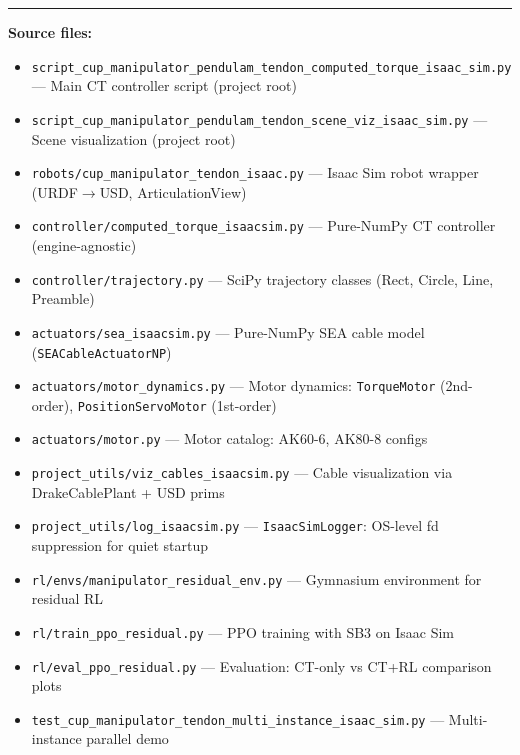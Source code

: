 \documentclass[11pt,a4paper]{article}
\begin{document}
\vfill
\noindent\rule{\linewidth}{0.4pt}
\begin{small}
\textbf{Source files:}
\begin{itemize}[leftmargin=2em, topsep=2pt, itemsep=1pt]
    \item \texttt{script\_cup\_manipulator\_pendulam\_tendon\_computed\_torque\_isaac\_sim.py} --- Main CT controller script (project root)
    \item \texttt{script\_cup\_manipulator\_pendulam\_tendon\_scene\_viz\_isaac\_sim.py} --- Scene visualization (project root)
    \item \texttt{robots/cup\_manipulator\_tendon\_isaac.py} --- Isaac Sim robot wrapper (URDF$\to$USD, ArticulationView)
    \item \texttt{controller/computed\_torque\_isaacsim.py} --- Pure-NumPy CT controller (engine-agnostic)
    \item \texttt{controller/trajectory.py} --- SciPy trajectory classes (Rect, Circle, Line, Preamble)
    \item \texttt{actuators/sea\_isaacsim.py} --- Pure-NumPy SEA cable model (\texttt{SEACableActuatorNP})
    \item \texttt{actuators/motor\_dynamics.py} --- Motor dynamics: \texttt{TorqueMotor} (2nd-order), \texttt{PositionServoMotor} (1st-order)
    \item \texttt{actuators/motor.py} --- Motor catalog: AK60-6, AK80-8 configs
    \item \texttt{project\_utils/viz\_cables\_isaacsim.py} --- Cable visualization via DrakeCablePlant + USD prims
    \item \texttt{project\_utils/log\_isaacsim.py} --- \texttt{IsaacSimLogger}: OS-level fd suppression for quiet startup
    \item \texttt{rl/envs/manipulator\_residual\_env.py} --- Gymnasium environment for residual RL
    \item \texttt{rl/train\_ppo\_residual.py} --- PPO training with SB3 on Isaac Sim
    \item \texttt{rl/eval\_ppo\_residual.py} --- Evaluation: CT-only vs CT+RL comparison plots
    \item \texttt{test\_cup\_manipulator\_tendon\_multi\_instance\_isaac\_sim.py} --- Multi-instance parallel demo
\end{itemize}
\end{small}
\end{document}
